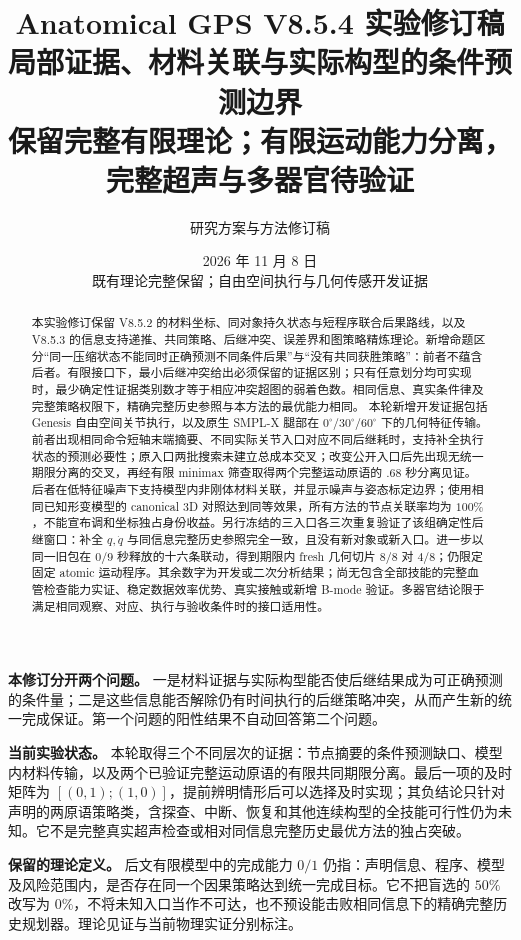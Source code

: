 \documentclass[11pt,a4paper,fontset=fandol]{ctexart}
\title{\color{ink}\bfseries Anatomical GPS V8.5.4 实验修订稿\\[.35em]
\LARGE 局部证据、材料关联与实际构型的条件预测边界\\[.4em]
\large 保留完整有限理论；有限运动能力分离，完整超声与多器官待验证}
\author{研究方案与方法修订稿}
\date{2026 年 11 月 8 日\\[.2em]\small 既有理论完整保留；自由空间执行与几何传感开发证据}
\theoremstyle{definition}
\theoremstyle{remark}\newtheorem{remark}[theorem]{说明}
\numberwithin{equation}{section}
\begin{document}
\maketitle
\begin{abstract}
本实验修订保留 V8.5.2 的材料坐标、同对象持久状态与短程序联合后果路线，以及 V8.5.3 的信息支持递推、共同策略、后继冲突、误差界和图策略精炼理论。新增命题区分“同一压缩状态不能同时正确预测不同条件后果”与“没有共同获胜策略”：前者不蕴含后者。有限接口下，最小后继冲突给出必须保留的证据区别；只有任意划分均可实现时，最少确定性证据类别数才等于相应冲突超图的弱着色数。相同信息、真实条件律及完整策略权限下，精确完整历史参照与本方法的最优能力相同。
本轮新增开发证据包括 Genesis 自由空间关节执行，以及原生 SMPL-X 腿部在 $0^\circ/30^\circ/60^\circ$ 下的几何特征传输。前者出现相同命令短轴末端摘要、不同实际关节入口对应不同后继耗时，支持补全执行状态的预测必要性；原入口两批搜索未建立总成本交叉；改变公开入口后先出现无统一期限分离的交叉，再经有限 minimax 筛查取得两个完整运动原语的 $.68$ 秒分离见证。后者在低特征噪声下支持模型内非刚体材料关联，并显示噪声与姿态标定边界；使用相同已知形变模型的 canonical 3D 对照达到同等效果，所有方法的节点关联率均为 $100\%$，不能宣布调和坐标独占身份收益。另行冻结的三入口各三次重复验证了该组确定性后继窗口：补全 $q,\dot q$ 与同信息完整历史参照完全一致，且没有新对象或新入口。进一步以同一旧包在 $0/9$ 秒释放的十六条联动，得到期限内 fresh 几何切片 $8/8$ 对 $4/8$；仍限定固定 atomic 运动程序。其余数字为开发或二次分析结果；尚无包含全部技能的完整血管检查能力实证、稳定数据效率优势、真实接触或新增 B-mode 验证。多器官结论限于满足相同观察、对应、执行与验收条件时的接口适用性。
\end{abstract}

\begin{corebox}
\textbf{本修订分开两个问题。}
一是材料证据与实际构型能否使后继结果成为可正确预测的条件量；二是这些信息能否解除仍有时间执行的后继策略冲突，从而产生新的统一完成保证。第一个问题的阳性结果不自动回答第二个问题。

\textbf{当前实验状态。} 本轮取得三个不同层次的证据：节点摘要的条件预测缺口、模型内材料传输，以及两个已验证完整运动原语的有限共同期限分离。最后一项的及时矩阵为 $[(0,1);(1,0)]$，提前辨明情形后可以选择及时实现；其负结论只针对声明的两原语策略类，含探查、中断、恢复和其他连续构型的全技能可行性仍为未知。它不是完整真实超声检查或相对同信息完整历史最优方法的独占突破。

\textbf{保留的理论定义。} 后文有限模型中的完成能力 $0/1$ 仍指：声明信息、程序、模型及风险范围内，是否存在同一个因果策略达到统一完成目标。它不把盲选的 $50\%$ 改写为 $0\%$，不将未知入口当作不可达，也不预设能击败相同信息下的精确完整历史规划器。理论见证与当前物理实证分别标注。
\end{corebox}
\end{document}
